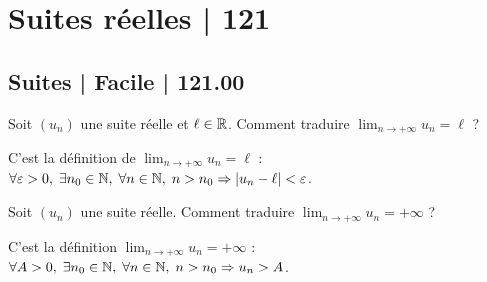




\section{Suites réelles | 121}

\subsection{Suites | Facile | 121.00}


\begin{question}
Soit $(u_n)$ une suite réelle et $\ell \in \mathbb{R}$. Comment traduire $\displaystyle \lim _{n\to +\infty}u_n=\ell$ ?
\begin{answers}  
\end{answers}
\begin{explanations}
C'est la définition de $\displaystyle \lim _{n\to +\infty}u_n=\ell$ : $\forall \varepsilon >0,\; \exists n_0\in \mathbb{N},\; \forall n\in \mathbb{N},\; n>n_0\Rightarrow |u_n-\ell|<\varepsilon$.
\end{explanations}
\end{question}



\begin{question}
Soit $(u_n)$ une suite réelle. Comment traduire $\displaystyle \lim _{n\to +\infty}u_n=+\infty$ ?
\begin{answers}  
\end{answers}
\begin{explanations}
C'est la définition $\displaystyle \lim _{n\to +\infty}u_n=+\infty$ : $\forall A>0,\; \exists n_0\in \mathbb{N},\; \forall n\in \mathbb{N},\; n>n_0\Rightarrow u_n>A$.
\end{explanations}
\end{question}




